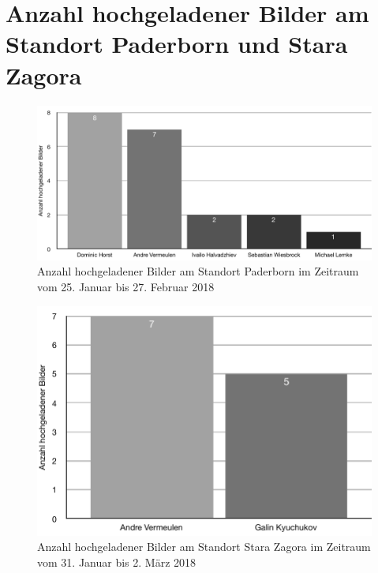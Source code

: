 \chapter{Anzahl hochgeladener Bilder am Standort Paderborn und Stara Zagora}
\begin{figure}[h]
  \centering
  \includegraphics[keepaspectratio, width=\textwidth]{data/usage_pb}
  \caption{Anzahl hochgeladener Bilder am Standort Paderborn im Zeitraum vom 25. Januar bis 27. Februar 2018}
  \label{fig:usagepb}
\end{figure}

\begin{figure}[h]
  \centering
  \includegraphics[keepaspectratio, width=\textwidth]{data/usage_bg}
  \caption{Anzahl hochgeladener Bilder am Standort Stara Zagora im Zeitraum vom 31. Januar bis 2. März 2018}
  \label{fig:usagebg}
\end{figure}
